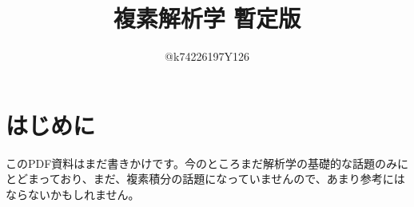 \documentclass[10pt,a4paper,titlepage]{jsarticle}
\title{複素解析学 暫定版}
\author{@k74226197Y126}
\begin{document}
\maketitle
{}
\section*{はじめに}
\par
このPDF資料はまだ書きかけです。今のところまだ解析学の基礎的な話題のみにとどまっており、まだ、複素積分の話題になっていませんので、あまり参考にはならないかもしれません。
\tableofcontents
\clearpage
{}


\clearpage

\clearpage

\clearpage

\clearpage

\clearpage


\clearpage

\clearpage

\clearpage

\clearpage
\clearpage


\clearpage

\clearpage

\clearpage


\clearpage

\clearpage

%
\end{document}
